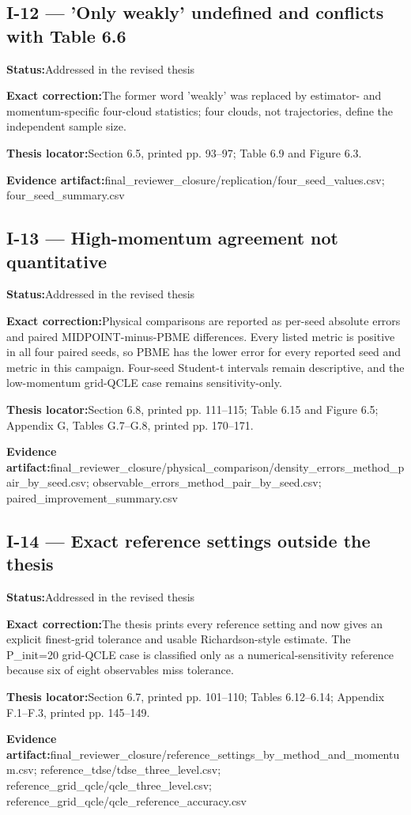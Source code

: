 \documentclass[11pt]{article}
\newcommand{\field}[2]{\textbf{#1}\quad #2\par}
\begin{document}
\subsection*{I-12 --- 'Only weakly' undefined and conflicts with Table 6.6}
\field{Status:}{Addressed in the revised thesis}
\field{Exact correction:}{The former word 'weakly' was replaced by estimator- and momentum-specific four-cloud statistics; four clouds, not trajectories, define the independent sample size.}
\field{Thesis locator:}{Section 6.5, printed pp. 93--97; Table 6.9 and Figure 6.3.}
\field{Evidence artifact:}{final\_reviewer\_closure/replication/four\_seed\_values.csv; four\_seed\_summary.csv}
\subsection*{I-13 --- High-momentum agreement not quantitative}
\field{Status:}{Addressed in the revised thesis}
\field{Exact correction:}{Physical comparisons are reported as per-seed absolute errors and paired MIDPOINT-minus-PBME differences. Every listed metric is positive in all four paired seeds, so PBME has the lower error for every reported seed and metric in this campaign. Four-seed Student-t intervals remain descriptive, and the low-momentum grid-QCLE case remains sensitivity-only.}
\field{Thesis locator:}{Section 6.8, printed pp. 111--115; Table 6.15 and Figure 6.5; Appendix G, Tables G.7--G.8, printed pp. 170--171.}
\field{Evidence artifact:}{final\_reviewer\_closure/physical\_comparison/density\_errors\_method\_pair\_by\_seed.csv; observable\_errors\_method\_pair\_by\_seed.csv; paired\_improvement\_summary.csv}
\subsection*{I-14 --- Exact reference settings outside the thesis}
\field{Status:}{Addressed in the revised thesis}
\field{Exact correction:}{The thesis prints every reference setting and now gives an explicit finest-grid tolerance and usable Richardson-style estimate. The P\_init=20 grid-QCLE case is classified only as a numerical-sensitivity reference because six of eight observables miss tolerance.}
\field{Thesis locator:}{Section 6.7, printed pp. 101--110; Tables 6.12--6.14; Appendix F.1--F.3, printed pp. 145--149.}
\field{Evidence artifact:}{final\_reviewer\_closure/reference\_settings\_by\_method\_and\_momentum.csv; reference\_tdse/tdse\_three\_level.csv; reference\_grid\_qcle/qcle\_three\_level.csv; reference\_grid\_qcle/qcle\_reference\_accuracy.csv}
\end{document}
